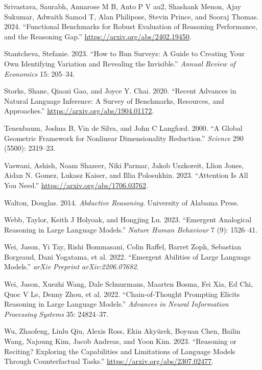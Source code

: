 \documentclass[
]{article}
\newlength{\cslhangindent}
\newenvironment{CSLReferences}[2] %
 {\begin{list}{}{%
  \setlength{\itemindent}{0pt}
  \setlength{\leftmargin}{0pt}
  \setlength{\parsep}{0pt}
  \ifodd #1
   \setlength{\leftmargin}{\cslhangindent}
   \setlength{\itemindent}{-1\cslhangindent}
  \fi
  \setlength{\itemsep}{#2\baselineskip}}}
 {\end{list}}
\begin{document}
\begin{CSLReferences}{1}{0}
Srivastava, Saurabh, Annarose M B, Anto P V au2, Shashank Menon, Ajay
Sukumar, Adwaith Samod T, Alan Philipose, Stevin Prince, and Sooraj
Thomas. 2024. {``Functional Benchmarks for Robust Evaluation of
Reasoning Performance, and the Reasoning Gap.''}
\url{https://arxiv.org/abs/2402.19450}.

Stantcheva, Stefanie. 2023. {``How to Run Surveys: A Guide to Creating
Your Own Identifying Variation and Revealing the Invisible.''}
\emph{Annual Review of Economics} 15: 205--34.

Storks, Shane, Qiaozi Gao, and Joyce Y. Chai. 2020. {``Recent Advances
in Natural Language Inference: A Survey of Benchmarks, Resources, and
Approaches.''} \url{https://arxiv.org/abs/1904.01172}.

Tenenbaum, Joshua B, Vin de Silva, and John C Langford. 2000. {``A
Global Geometric Framework for Nonlinear Dimensionality Reduction.''}
\emph{Science} 290 (5500): 2319--23.

Vaswani, Ashish, Noam Shazeer, Niki Parmar, Jakob Uszkoreit, Llion
Jones, Aidan N. Gomez, Lukasz Kaiser, and Illia Polosukhin. 2023.
{``Attention Is All You Need.''} \url{https://arxiv.org/abs/1706.03762}.

Walton, Douglas. 2014. \emph{Abductive Reasoning}. University of Alabama
Press.

Webb, Taylor, Keith J Holyoak, and Hongjing Lu. 2023. {``Emergent
Analogical Reasoning in Large Language Models.''} \emph{Nature Human
Behaviour} 7 (9): 1526--41.

Wei, Jason, Yi Tay, Rishi Bommasani, Colin Raffel, Barret Zoph,
Sebastian Borgeaud, Dani Yogatama, et al. 2022. {``Emergent Abilities of
Large Language Models.''} \emph{arXiv Preprint arXiv:2206.07682}.

Wei, Jason, Xuezhi Wang, Dale Schuurmans, Maarten Bosma, Fei Xia, Ed
Chi, Quoc V Le, Denny Zhou, et al. 2022. {``Chain-of-Thought Prompting
Elicits Reasoning in Large Language Models.''} \emph{Advances in Neural
Information Processing Systems} 35: 24824--37.

Wu, Zhaofeng, Linlu Qiu, Alexis Ross, Ekin Akyürek, Boyuan Chen, Bailin
Wang, Najoung Kim, Jacob Andreas, and Yoon Kim. 2023. {``Reasoning or
Reciting? Exploring the Capabilities and Limitations of Language Models
Through Counterfactual Tasks.''} \url{https://arxiv.org/abs/2307.02477}.


\end{CSLReferences}
\end{document}
